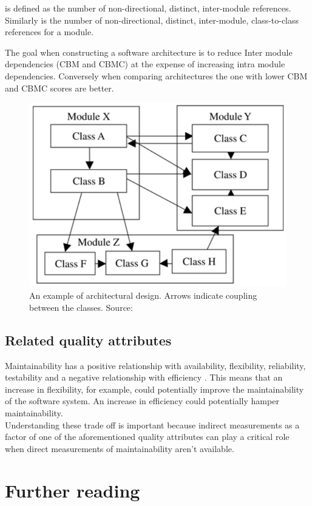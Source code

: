 \documentclass[dvips,12pt]{article}
\begin{document}
 is defined as the number of non-directional, distinct, inter-module references. Similarly  is the number of non-directional, distinct, inter-module, class-to-class references for a module.

The goal when constructing a software architecture is to reduce Inter module dependencies (CBM and CBMC) at the expense of increasing intra module dependencies. Conversely when comparing architectures the one with lower CBM and CBMC scores are better.

\begin{figure}
\includegraphics[width=0.5\linewidth]{./coupling}
\caption{An example of architectural design. Arrows indicate coupling between the classes. Source: \cite{lindvall_empirically-based_2003}}
\label{fig:coupling}
\end{figure}


\subsection{Related quality attributes}
Maintainability has a positive relationship with availability, flexibility, reliability, testability and a negative relationship with efficiency \cite{karl_software_2003}. This means that an increase in flexibility, for example, could potentially improve the maintainability of the software system. An increase in efficiency could potentially hamper maintainability.\\

Understanding these trade off is important because indirect measurements as a factor of one of the aforementioned quality attributes can play a critical role when direct measurements of maintainability aren't available.

\section{Further reading}
\end{document}

